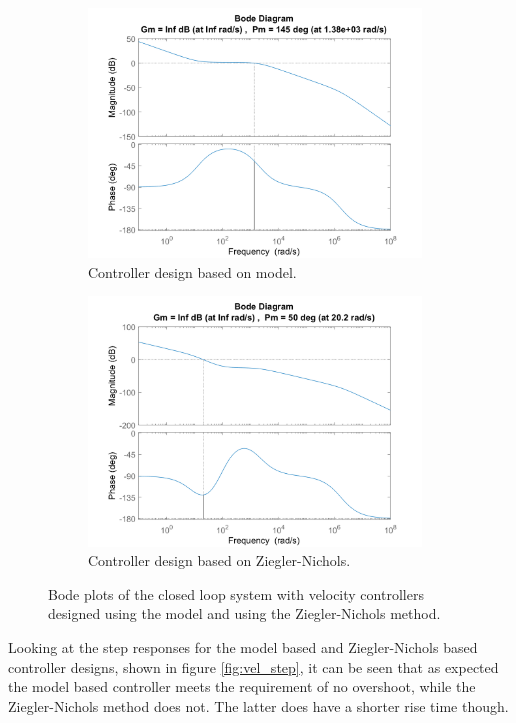 \documentclass[../../main.tex]{subfiles}
\begin{document}
\begin{figure}[h]
\begin{subfigure}{0.48\textwidth}
    \includegraphics[width = 0.97\textwidth]{Sections/System_Design/Images/SM_TiltMotorVel_polePlace.png}
    \caption{Controller design based on model.}
    \label{fig:vel_PP_stability_plot}
\end{subfigure}\quad
\begin{subfigure}{0.48\textwidth}
    \includegraphics[width = 0.97\textwidth]{Sections/System_Design/Images/SM_TiltMotorVel_NZ.png}
    \caption{Controller design based on Ziegler-Nichols.}
    \label{fig:vel_ZN_stabilty_plot}
\end{subfigure}
\caption{Bode plots of the closed loop system with velocity controllers designed using the model and using the Ziegler-Nichols method.}
\label{fig:vel_stability_plots}
\end{figure}
Looking at the step responses for the model based and Ziegler-Nichols based controller designs, shown in figure \ref{fig:vel_step}, it can be seen that as expected the model based controller meets the requirement of no overshoot, while the Ziegler-Nichols method does not. The latter does have a shorter rise time though.
\end{document}
